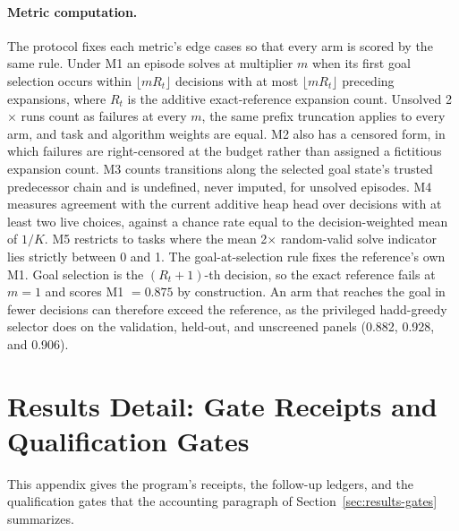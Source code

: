 \paragraph{Metric computation.}
The protocol fixes each metric's edge cases so that every arm is scored by the same rule. Under M1 an episode solves at multiplier $m$ when its first goal selection occurs within $\lfloor m R_t \rfloor$ decisions with at most $\lfloor m R_t \rfloor$ preceding expansions, where $R_t$ is the additive exact-reference expansion count. Unsolved 2$\times$ runs count as failures at every $m$, the same prefix truncation applies to every arm, and task and algorithm weights are equal. M2 also has a censored form, in which failures are right-censored at the budget rather than assigned a fictitious expansion count. M3 counts transitions along the selected goal state's trusted predecessor chain and is undefined, never imputed, for unsolved episodes. M4 measures agreement with the current additive heap head over decisions with at least two live choices, against a chance rate equal to the decision-weighted mean of $1/K$. M5 restricts to tasks where the mean 2$\times$ random-valid solve indicator lies strictly between 0 and 1.
The goal-at-selection rule fixes the reference's own M1. Goal selection is the $(R_t{+}1)$-th decision, so the exact reference fails at $m = 1$ and scores M1 $= 0.875$ by construction. An arm that reaches the goal in fewer decisions can therefore exceed the reference, as the privileged hadd-greedy selector does on the validation, held-out, and unscreened panels (0.882, 0.928, and 0.906).


\section{Results Detail: Gate Receipts and Qualification Gates}
\label{app:results-gates}

This appendix gives the program's receipts, the follow-up ledgers, and the qualification gates that the accounting paragraph of Section~\ref{sec:results-gates} summarizes.

